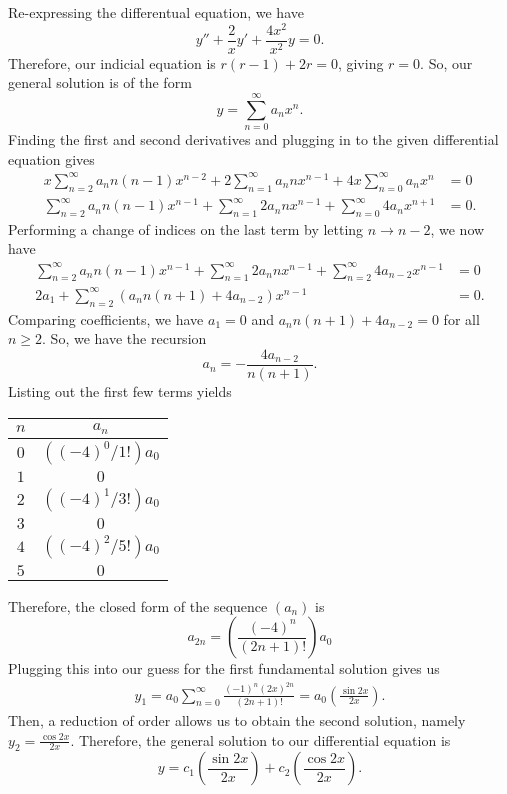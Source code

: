\begin{soln}
    Re-expressing the differentual equation, we have
    $$y'' + \frac{2}{x}y' + \frac{4x^2}{x^2}y = 0.$$
    Therefore, our indicial equation is $r(r-1)+2r=0$, giving $r=0$. So, our
    general solution is of the form
    $$y = \sum_{n = 0}^{\infty} a_n x^n.$$ Finding the first and second derivatives
    and plugging in to the given differential equation gives
    \begin{align*}
        x\sum_{n = 2}^{\infty} a_n n (n-1)x^{n-2} + 2\sum_{n = 1}^{\infty} a_n n x^{n-1}
        + 4x \sum_{n = 0}^{\infty} a_n x^n &= 0 \\
        \sum_{n = 2}^{\infty} a_n n (n-1)x^{n-1} + \sum_{n = 1}^{\infty} 2a_n n x^{n-1}
        +  \sum_{n = 0}^{\infty}4 a_n x^{n+1} &= 0.
    \end{align*}
    Performing a change of indices on the last term by letting $n \rightarrow n-2$,
    we now have
    \begin{align*}
        \sum_{n = 2}^{\infty} a_n n (n-1)x^{n-1} + \sum_{n = 1}^{\infty} 2a_n n x^{n-1}
        +  \sum_{n = 2}^{\infty}4 a_{n-2} x^{n-1} &= 0 \\
        2a_1 + \sum_{n = 2}^{\infty} \left(a_n n (n+1)+4a_{n-2}  \right)x^{n-1} &= 0.
    \end{align*}
    Comparing coefficients, we have $a_1 = 0$ and $a_n n (n+1) + 4a_{n-2} = 0$ for
    all $n \geq 2$. So, we have the recursion $$a_n = -\frac{4a_{n-2}}{n(n+1)}.$$
    Listing out the first few terms yields
    \begin{center}
        \begin{tabular}{| c | c |}
            \hline
            $n$ & $a_n$ \\
            \hline
            $0$ & $((-4)^0/1!)a_0$ \\
            $1$ & $0$ \\
            $2$ & $((-4)^1/3!)a_0$ \\
            $3$ & $0$ \\
            $4$ & $((-4)^2/5!)a_0$ \\
            $5$ & $0$ \\
            \hline
        \end{tabular}
    \end{center}
    Therefore, the closed form of the sequence $(a_n)$ is 
    $$a_{2n} = \left(\frac{(-4)^n}{(2n+1)!}\right)a_0$$
    Plugging this into our guess for the first fundamental solution gives us
    \begin{align*}
        y_1 = a_0\sum_{n = 0}^{\infty} \frac{(-1)^n(2x)^{2n}}{(2n+1)!} = a_0\left(\frac{\sin 2x}{2x}\right).
    \end{align*}
    Then, a reduction of order allows us to obtain the second solution, namely
    $y_2 = \frac{\cos 2x}{2x}$. Therefore, the general solution to our differential
    equation is $$y = c_1\left(\frac{\sin 2x}{2x}\right)+c_2\left(\frac{\cos 2x}{2x}\right).$$
\end{soln}

